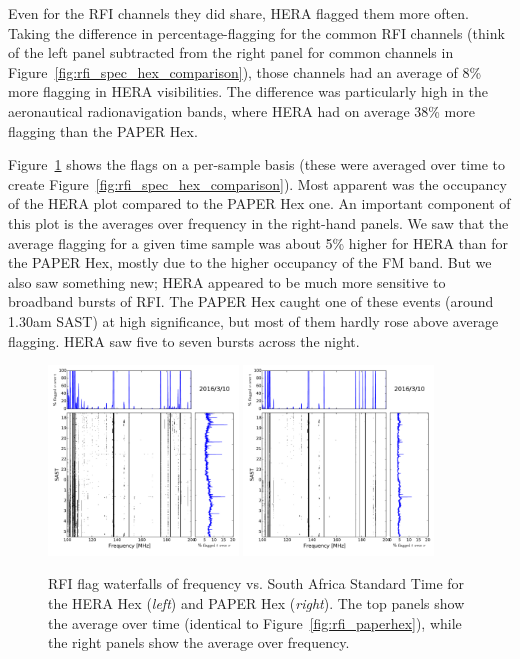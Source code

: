 Even for the RFI channels they did share, HERA flagged them more often. Taking the difference in percentage-flagging for the common RFI channels (think of the left panel subtracted from the right panel for common channels in Figure~\ref{fig:rfi_spec_hex_comparison}), those channels had an average of 8\% more flagging in HERA visibilities. The difference was particularly high in the aeronautical radionavigation bands, where HERA had on average 38\% more flagging than the PAPER Hex.

Figure~\ref{fig:rfi_hex_waterfalls} shows the flags on a per-sample basis (these were averaged over time to create Figure~\ref{fig:rfi_spec_hex_comparison}). Most apparent was the occupancy of the HERA plot compared to the PAPER Hex one. An important component of this plot is the averages over frequency in the right-hand panels. We saw that the average flagging for a given time sample was about 5\% higher for HERA than for the PAPER Hex, mostly due to the higher occupancy of the FM band. But we also saw something new; HERA appeared to be much more sensitive to broadband bursts of RFI. The PAPER Hex caught one of these events (around 1.30am SAST) at high significance, but most of them hardly rose above average flagging. HERA saw five to seven bursts across the night. 

\begin{figure}
\centering
\includegraphics[width=0.45\textwidth]{chapters/data_processing/figures/RFI_HH_wf_tzoom.pdf}
\includegraphics[width=0.45\textwidth]{chapters/data_processing/figures/RFI_PH_wf_tzoom.pdf}
\caption[RFI flag waterfalls of frequency vs. South Africa Standard Time for the HERA Hex and PAPER Hex.]{RFI flag waterfalls of frequency vs. South Africa Standard Time for the HERA Hex (\textit{left}) and PAPER Hex (\textit{right}). The top panels show the average over time (identical to Figure~\ref{fig:rfi_paperhex}), while the right panels show the average over frequency.}
\label{fig:rfi_hex_waterfalls}
\end{figure}

